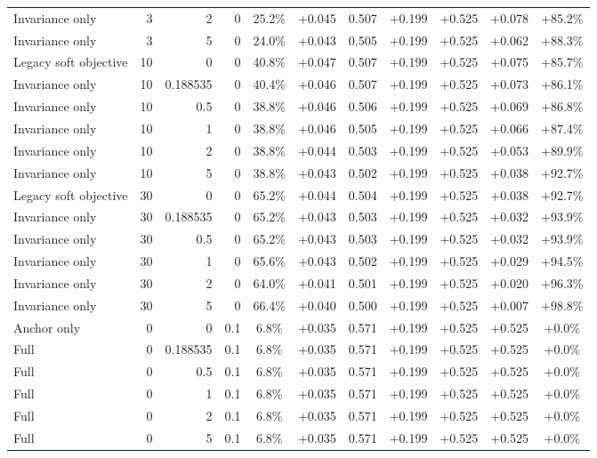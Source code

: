 \begin{table}[htbp]
\begin{tabular}{lrrrccccccc}
Invariance only & 3 & 2 & 0 & 25.2\% & +0.045 & 0.507 & +0.199 & +0.525 & +0.078 & +85.2\% \\
Invariance only & 3 & 5 & 0 & 24.0\% & +0.043 & 0.505 & +0.199 & +0.525 & +0.062 & +88.3\% \\
Legacy soft objective & 10 & 0 & 0 & 40.8\% & +0.047 & 0.507 & +0.199 & +0.525 & +0.075 & +85.7\% \\
Invariance only & 10 & 0.188535 & 0 & 40.4\% & +0.046 & 0.507 & +0.199 & +0.525 & +0.073 & +86.1\% \\
Invariance only & 10 & 0.5 & 0 & 38.8\% & +0.046 & 0.506 & +0.199 & +0.525 & +0.069 & +86.8\% \\
Invariance only & 10 & 1 & 0 & 38.8\% & +0.046 & 0.505 & +0.199 & +0.525 & +0.066 & +87.4\% \\
Invariance only & 10 & 2 & 0 & 38.8\% & +0.044 & 0.503 & +0.199 & +0.525 & +0.053 & +89.9\% \\
Invariance only & 10 & 5 & 0 & 38.8\% & +0.043 & 0.502 & +0.199 & +0.525 & +0.038 & +92.7\% \\
Legacy soft objective & 30 & 0 & 0 & 65.2\% & +0.044 & 0.504 & +0.199 & +0.525 & +0.038 & +92.7\% \\
Invariance only & 30 & 0.188535 & 0 & 65.2\% & +0.043 & 0.503 & +0.199 & +0.525 & +0.032 & +93.9\% \\
Invariance only & 30 & 0.5 & 0 & 65.2\% & +0.043 & 0.503 & +0.199 & +0.525 & +0.032 & +93.9\% \\
Invariance only & 30 & 1 & 0 & 65.6\% & +0.043 & 0.502 & +0.199 & +0.525 & +0.029 & +94.5\% \\
Invariance only & 30 & 2 & 0 & 64.0\% & +0.041 & 0.501 & +0.199 & +0.525 & +0.020 & +96.3\% \\
Invariance only & 30 & 5 & 0 & 66.4\% & +0.040 & 0.500 & +0.199 & +0.525 & +0.007 & +98.8\% \\
Anchor only & 0 & 0 & 0.1 & 6.8\% & +0.035 & 0.571 & +0.199 & +0.525 & +0.525 & +0.0\% \\
Full & 0 & 0.188535 & 0.1 & 6.8\% & +0.035 & 0.571 & +0.199 & +0.525 & +0.525 & +0.0\% \\
Full & 0 & 0.5 & 0.1 & 6.8\% & +0.035 & 0.571 & +0.199 & +0.525 & +0.525 & +0.0\% \\
Full & 0 & 1 & 0.1 & 6.8\% & +0.035 & 0.571 & +0.199 & +0.525 & +0.525 & +0.0\% \\
Full & 0 & 2 & 0.1 & 6.8\% & +0.035 & 0.571 & +0.199 & +0.525 & +0.525 & +0.0\% \\
Full & 0 & 5 & 0.1 & 6.8\% & +0.035 & 0.571 & +0.199 & +0.525 & +0.525 & +0.0\% \\

\end{tabular}
\end{table}
